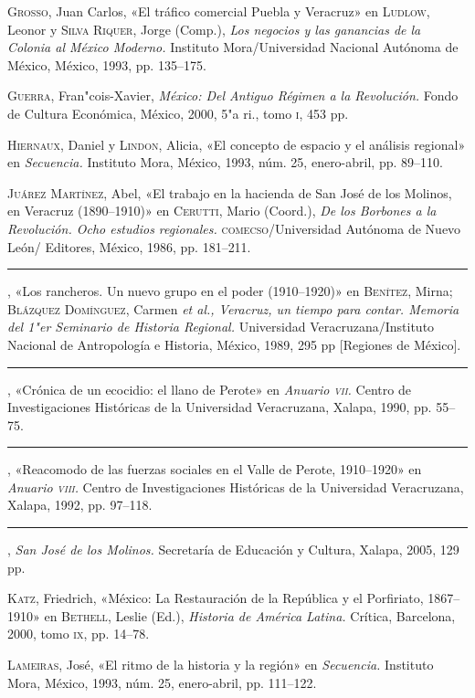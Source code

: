 \documentclass[14pt,twoside,final]{extbook} %
\begin{document}
\textsc{Grosso}, Juan Carlos, «El tráfico comercial Puebla y Veracruz» en \textsc{Ludlow}, Leonor y \textsc{Silva Riquer}, Jorge (Comp.), \emph{Los negocios y las ganancias de la Colonia al México Moderno.} Instituto Mora/Universidad Nacional Autónoma de México, México, 1993, pp. 135--175.

\textsc{Guerra}, Fran"cois-Xavier, \emph{México: Del Antiguo Régimen a la Revolución.} Fondo de Cultura Económica, México, 2000, 5"a ri., tomo \textsc{i}, 453 pp.

\textsc{Hiernaux}, Daniel y \textsc{Lindon}, Alicia, «El concepto de espacio y el análisis regional» en \textit{Secuencia.} Instituto Mora, México, 1993, núm. 25, enero-abril, pp. 89--110.

\textsc{Juárez Martínez}, Abel, «El trabajo en la hacienda de San José de los Molinos, en Veracruz (1890--1910)» en \textsc{Cerutti}, Mario (Coord.), \emph{De los Borbones a la Revolución. Ocho estudios regionales.} \textsc{comecso}/Universidad Autónoma de Nuevo León/ Editores, México, 1986, pp. 181--211.

\rule{1cm}{0.4pt}, «Los rancheros. Un nuevo grupo en el poder (1910--1920)» en \textsc{Benítez}, Mirna; \textsc{Blázquez Domínguez}, Carmen \emph{et al., Veracruz, un tiempo para contar. Memoria del 1"er Seminario de Historia Regional.} Universidad Veracruzana/Instituto Nacional de Antropología e Historia, México, 1989, 295 pp [Regiones de México].

\rule{1cm}{0.4pt}, «Crónica de un ecocidio: el llano de Perote» en \textit{Anuario \textsc{vii}.} Centro de Investigaciones Históricas de la Universidad Veracruzana, Xalapa, 1990, pp. 55--75.

\rule{1cm}{0.4pt}, «Reacomodo de las fuerzas sociales en el Valle de Perote, 1910--1920» en \textit{Anuario \textsc{viii}.} Centro de Investigaciones Históricas de la Universidad Veracruzana, Xalapa, 1992, pp. 97--118.

\rule{1cm}{0.4pt}, \emph{San José de los Molinos.} Secretaría de Educación y Cultura, Xalapa, 2005, 129 pp.

\textsc{Katz}, Friedrich, «México: La Restauración de la República y el Porfiriato, 1867--1910» en \textsc{Bethell}, Leslie (Ed.), \emph{Historia de América Latina.} Crítica, Barcelona, 2000, tomo \textsc{ix}, pp. 14--78.

\textsc{Lameiras}, José, «El ritmo de la historia y la región» en \textit{Secuencia.} Instituto Mora, México, 1993, núm. 25, enero-abril, pp. 111--122.
\end{document}
